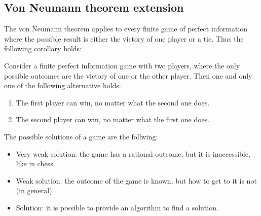 \subsection*{Von Neumann theorem extension}
The von Neumann theorem applies to every finite game of perfect information where the possible result is either the victory of one player or a tie. Thus the following corollary holds:
\begin{corollary}
    Consider a finite perfect information game with two players, where the only possible outcomes are the victory of one or the other player. 
    Then one and only one of the following alternative holds:
    \begin{enumerate}
        \item The first player can win, no matter what the second one does.
        \item The second player can win, no matter what the first one does.
    \end{enumerate}
\end{corollary}
The possible solutions of a game are the follwing: 
\begin{itemize}
    \item Very weak solution: the game has a rational outcome, but it is inaccessible, like in chess.
    \item Weak solution: the outcome of the game is known, but how to get to it is not (in general).
    \item Solution: it is possible to provide an algorithm to find a solution.
\end{itemize}
